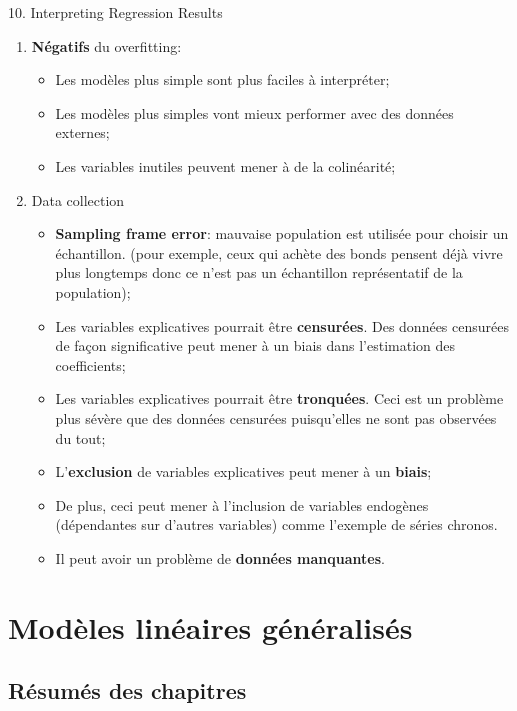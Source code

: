 \documentclass[12pt, titlepage, french]{report}
\begin{document}
\begin{CHPT_SUMM}[label = {PREV-INTERP}]{10. Interpreting Regression Results}
\begin{enumerate}
\begin{itemize}
		\item	Prévisions seront sans biais. Exclure une variable pertinente peut mener à un biais.
	\end{itemize}
	\item[]	\textbf{Négatifs} du overfitting:
	\begin{itemize}
		\item	Les modèles plus simple sont plus faciles à interpréter;
		\item	Les modèles plus simples vont mieux performer avec des données externes;
		\item	Les variables inutiles peuvent mener à de la colinéarité;
	\end{itemize}
	\item	Data collection
	\begin{itemize}
		\item	\textbf{Sampling frame error}: mauvaise population est utilisée pour choisir un échantillon. (pour exemple, ceux qui achète des bonds pensent déjà vivre plus longtemps donc ce n'est pas un échantillon représentatif de la population);
		\item	Les variables explicatives pourrait être \textbf{censurées}. Des données censurées de façon significative peut mener à un biais dans l'estimation des coefficients;
		\item	Les variables explicatives pourrait être \textbf{tronquées}. Ceci est un problème plus sévère que des données censurées puisqu'elles ne sont pas observées du tout;
		\item	L'\textbf{exclusion} de variables explicatives peut mener à un \textbf{biais};
		\item[]	De plus, ceci peut mener à l'inclusion de variables endogènes (dépendantes sur d'autres variables) comme l'exemple de séries chronos.
		\item	Il peut avoir un problème de \textbf{données manquantes}.
	\end{itemize}
\end{enumerate}
\end{CHPT_SUMM}

\section{Modèles linéaires généralisés}

\subsection{Résumés des chapitres}
\end{document}
